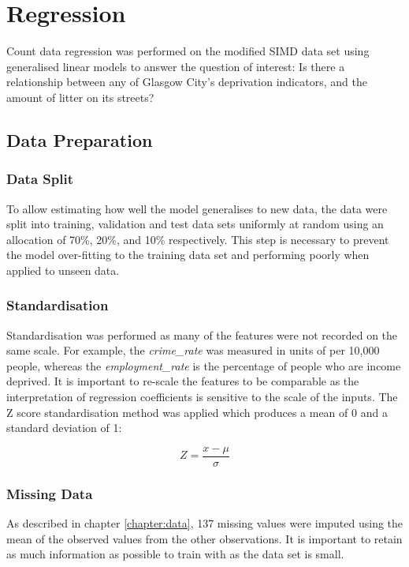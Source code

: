 \documentclass{thesis}
\begin{document}
\section{Regression}

Count data regression was performed on the modified SIMD data set using generalised linear models to answer the question of interest: Is there a relationship between any of Glasgow City's deprivation indicators, and the amount of litter on its streets?

\subsection{Data Preparation}

\subsubsection{Data Split}

To allow estimating how well the model generalises to new data, the data were split into training, validation and test data sets uniformly at random using an allocation of 70\%, 20\%, and 10\% respectively. This step is necessary to prevent the model over-fitting to the training data set and performing poorly when applied to unseen data.

\subsubsection{Standardisation} 

Standardisation was performed as many of the features were not recorded on the same scale. For example, the \textit{crime\_rate} was measured in units of per 10,000 people, whereas the \textit{employment\_rate} is the percentage of people who are income deprived. It is important to re-scale the features to be comparable as the interpretation of regression coefficients is sensitive to the scale of the inputs. The Z score standardisation method was applied which produces a mean of 0 and a standard deviation of 1:

\begin{equation}
    Z = \frac{x - \mu}{\sigma}
\end{equation}

\subsubsection{Missing Data} 

As described in chapter \ref{chapter:data}, 137 missing values were imputed using the mean of the observed values from the other observations. It is important to retain as much information as possible to train with as the data set is small.
\end{document}
